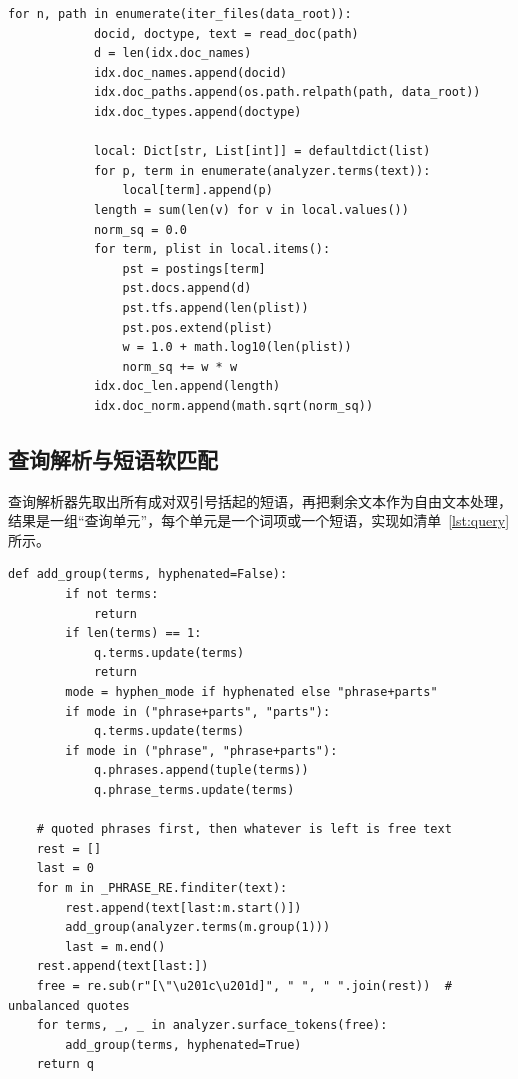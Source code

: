 \documentclass[12pt,a4paper]{ctexart}
\begin{document}
\begin{lstlisting}[caption={索引构建的主循环}, label={lst:build}, gobble=8]
        for n, path in enumerate(iter_files(data_root)):
            docid, doctype, text = read_doc(path)
            d = len(idx.doc_names)
            idx.doc_names.append(docid)
            idx.doc_paths.append(os.path.relpath(path, data_root))
            idx.doc_types.append(doctype)

            local: Dict[str, List[int]] = defaultdict(list)
            for p, term in enumerate(analyzer.terms(text)):
                local[term].append(p)
            length = sum(len(v) for v in local.values())
            norm_sq = 0.0
            for term, plist in local.items():
                pst = postings[term]
                pst.docs.append(d)
                pst.tfs.append(len(plist))
                pst.pos.extend(plist)
                w = 1.0 + math.log10(len(plist))
                norm_sq += w * w
            idx.doc_len.append(length)
            idx.doc_norm.append(math.sqrt(norm_sq))
\end{lstlisting}

\subsection{查询解析与短语软匹配}

查询解析器先取出所有成对双引号括起的短语，再把剩余文本作为自由文本处理，结果是一组“查询单元”，每个单元是一个词项或一个短语，实现如清单~\ref{lst:query} 所示。

\begin{lstlisting}[caption={查询解析：短语与连字符词的处理}, label={lst:query}, gobble=4]
    def add_group(terms, hyphenated=False):
        if not terms:
            return
        if len(terms) == 1:
            q.terms.update(terms)
            return
        mode = hyphen_mode if hyphenated else "phrase+parts"
        if mode in ("phrase+parts", "parts"):
            q.terms.update(terms)
        if mode in ("phrase", "phrase+parts"):
            q.phrases.append(tuple(terms))
            q.phrase_terms.update(terms)

    # quoted phrases first, then whatever is left is free text
    rest = []
    last = 0
    for m in _PHRASE_RE.finditer(text):
        rest.append(text[last:m.start()])
        add_group(analyzer.terms(m.group(1)))
        last = m.end()
    rest.append(text[last:])
    free = re.sub(r"[\"\u201c\u201d]", " ", " ".join(rest))  # unbalanced quotes
    for terms, _, _ in analyzer.surface_tokens(free):
        add_group(terms, hyphenated=True)
    return q
\end{lstlisting}
\end{document}
